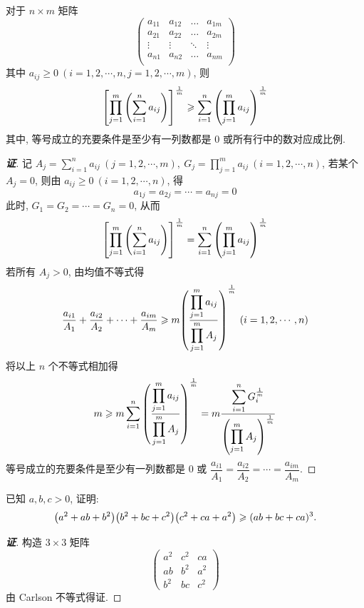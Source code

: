 \begin{theorem}
    对于 $n\times m$ 矩阵
    $$\begin{pmatrix}
            a_{11} & a_{12} & \dots  & a_{1m} \\
            a_{21} & a_{22} & \dots  & a_{2m} \\
            \vdots & \vdots & \ddots & \vdots \\
            a_{n1} & a_{n2} & \dots  & a_{nm} \\
        \end{pmatrix}$$
    其中 $a_{ij}\geqslant0~ (i=1,2,\cdots,n,j=1,2,\cdots,m)$, 则
    $$\qty[\prod_{j=1}^{m}\qty(\sum_{i=1}^{n}a_{ij})]^{\frac{1}{m}}\geqslant \sum_{i=1}^{n}\qty(\prod_{j=1}^{m}a_{ij})^{\frac{1}{m}}$$
    其中, 等号成立的充要条件是至少有一列数都是 0 或所有行中的数对应成比例.
\end{theorem}
\begin{proof}[{\songti \textbf{证}}]
    记 $\displaystyle A_j = \sum_{i=1}^{n}a_{ij}~ (j=1,2,\cdots,m),~G_j=\prod_{j=1}^{m}a_{ij}~ (i=1,2,\cdots,n)$, 
    若某个 $A_j=0$, 则由 $a_{ij}\geqslant 0~ (i=1,2,\cdots,n)$, 得 $$a_{1j}=a_{2j}=\cdots=a_{nj}=0$$
    此时, $G_1=G_2=\cdots=G_n=0$, 从而 $$\qty[\prod_{j=1}^{m}\qty(\sum_{i=1}^{n}a_{ij})]^{\frac{1}{m}}=\sum_{i=1}^{n}\qty(\prod_{j=1}^{m}a_{ij})^{\frac{1}{m}}$$
    若所有 $A_j>0$, 由均值不等式得 $$\dfrac{a_{i1}}{A_1}+\dfrac{a_{i2}}{A_2}+\cdots+\dfrac{a_{im}}{A_m}\geqslant m\qty(\dfrac{\displaystyle\prod_{j=1}^{m}a_{ij}}{\displaystyle\prod_{j=1}^{m}A_j})^{\frac{1}{m}}~ (i=1,2,\cdots,n)$$
    将以上 $n$ 个不等式相加得
    $$m\geqslant m\sum_{i=1}^{n}\qty(\dfrac{\displaystyle\prod_{j=1}^{m}a_{ij}}{\displaystyle\prod_{j=1}^{m}A_j})^{\frac{1}{m}}=m\dfrac{\displaystyle\sum_{i=1}^{n}G_i^{\frac{1}{m}}}{\qty(\displaystyle\prod_{j=1}^{m}A_j)^{\frac{1}{m}}}$$
    等号成立的充要条件是至少有一列数都是 0 或 $\dfrac{a_{i1}}{A_1}=\dfrac{a_{i2}}{A_2}=\cdots=\dfrac{a_{im}}{A_m}$.
\end{proof}

\begin{example}
    已知 $a,b,c>0$, 证明: $$\qty(a^2+ab+b^2)\qty(b^2+bc+c^2)\qty(c^2+ca+a^2)\geqslant (ab+bc+ca)^3.$$
\end{example}
\begin{proof}[{\songti \textbf{证}}]
    构造 $3\times 3$ 矩阵
    $$\begin{pmatrix}
            a^2 & c^2 & ca  \\
            ab  & b^2 & a^2 \\
            b^2 & bc  & c^2
        \end{pmatrix}$$
    由 Carlson 不等式得证.
\end{proof}

